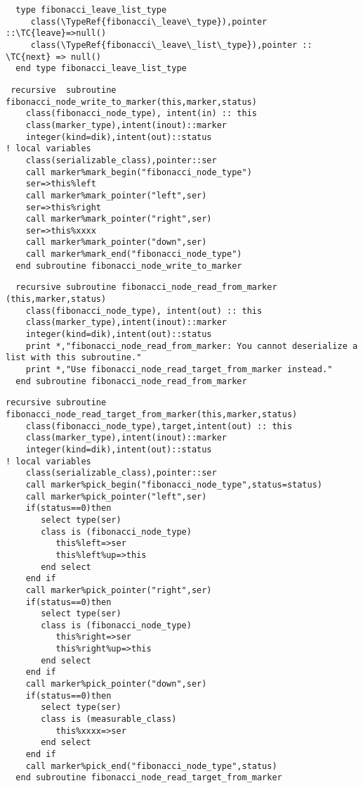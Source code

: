 \begin{Verbatim}
  type fibonacci_leave_list_type
     class(\TypeRef{fibonacci\_leave\_type}),pointer ::\TC{leave}=>null()
     class(\TypeRef{fibonacci\_leave\_list\_type}),pointer :: \TC{next} => null()
  end type fibonacci_leave_list_type
\end{Verbatim}
\Methods
{}

\begin{Verbatim}
 recursive  subroutine fibonacci_node_write_to_marker(this,marker,status)
    class(fibonacci_node_type), intent(in) :: this
    class(marker_type),intent(inout)::marker
    integer(kind=dik),intent(out)::status
! local variables
    class(serializable_class),pointer::ser
    call marker%mark_begin("fibonacci_node_type")
    ser=>this%left
    call marker%mark_pointer("left",ser)
    ser=>this%right
    call marker%mark_pointer("right",ser)
    ser=>this%xxxx
    call marker%mark_pointer("down",ser)
    call marker%mark_end("fibonacci_node_type")
  end subroutine fibonacci_node_write_to_marker
\end{Verbatim}

\begin{Verbatim}
  recursive subroutine fibonacci_node_read_from_marker (this,marker,status)
    class(fibonacci_node_type), intent(out) :: this
    class(marker_type),intent(inout)::marker
    integer(kind=dik),intent(out)::status
    print *,"fibonacci_node_read_from_marker: You cannot deserialize a list with this subroutine."
    print *,"Use fibonacci_node_read_target_from_marker instead."    
  end subroutine fibonacci_node_read_from_marker
\end{Verbatim}

\begin{Verbatim}
recursive subroutine fibonacci_node_read_target_from_marker(this,marker,status)
    class(fibonacci_node_type),target,intent(out) :: this
    class(marker_type),intent(inout)::marker
    integer(kind=dik),intent(out)::status
! local variables
    class(serializable_class),pointer::ser
    call marker%pick_begin("fibonacci_node_type",status=status)
    call marker%pick_pointer("left",ser)
    if(status==0)then
       select type(ser)
       class is (fibonacci_node_type)
          this%left=>ser
          this%left%up=>this
       end select
    end if
    call marker%pick_pointer("right",ser)
    if(status==0)then
       select type(ser)
       class is (fibonacci_node_type)
          this%right=>ser
          this%right%up=>this
       end select
    end if
    call marker%pick_pointer("down",ser)
    if(status==0)then
       select type(ser)
       class is (measurable_class)
          this%xxxx=>ser
       end select
    end if
    call marker%pick_end("fibonacci_node_type",status)
  end subroutine fibonacci_node_read_target_from_marker
\end{Verbatim}

